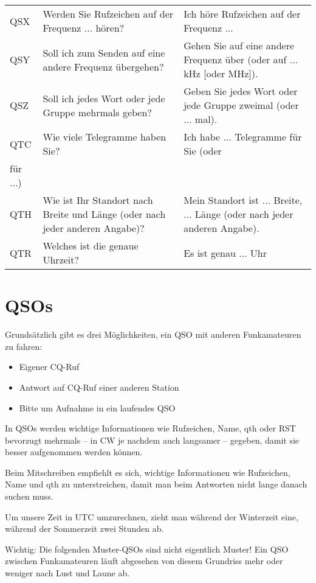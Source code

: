 {\begin{xtabular}{p{1cm}p{4cm}p{6cm}}
QSX & Werden Sie Rufzeichen auf der Fre­quenz ... hören? & Ich höre Rufzeichen auf der Fre­quenz ... \\
QSY & Soll ich zum Senden auf eine andere Frequenz übergehen? & Gehen Sie auf eine andere Frequenz über (oder auf ... kHz [oder MHz]). \\
QSZ & Soll ich jedes Wort oder jede Gruppe mehrmals geben? & Geben Sie jedes Wort oder jede Gruppe zweimal (oder ... mal). \\
QTC & Wie viele Telegramme haben Sie? & Ich habe ... Telegramme für Sie (oder \\ für ...) \\
QTH & Wie ist Ihr Standort nach Breite und Länge (oder nach jeder anderen Angabe)? & Mein Standort ist ... Breite, ... Länge (oder nach jeder anderen Angabe). \\
QTR & Welches ist die genaue Uhrzeit? & Es ist genau ... Uhr \\
\end{xtabular}
}

\section{QSOs}
Grundsätzlich gibt es drei Möglichkeiten, ein QSO mit anderen Funkamateuren zu fahren:
\begin{itemize}
 \item Eigener CQ-Ruf
 \item Antwort auf CQ-Ruf einer anderen Station
 \item Bitte um Aufnahme in ein laufendes QSO
\end{itemize}
In QSOs werden wichtige Informationen wie Rufzeichen, Name, qth oder RST bevorzugt mehrmals – in CW je nachdem auch langsamer – gegeben, damit sie besser aufgenommen werden können.

Beim Mitschreiben empfiehlt es sich, wichtige Informationen wie Rufzeichen, Name und qth zu unterstreichen, damit man beim Antworten nicht lange danach suchen muss.

Um unsere Zeit in UTC umzurechnen, zieht man während der Winterzeit eine, während der Sommerzeit zwei Stunden ab.

Wichtig: Die folgenden Muster-QSOs sind nicht eigentlich Muster! Ein QSO zwischen Funk­amateuren läuft abgesehen von diesem Grundriss mehr oder weniger nach Lust und Laune ab.

